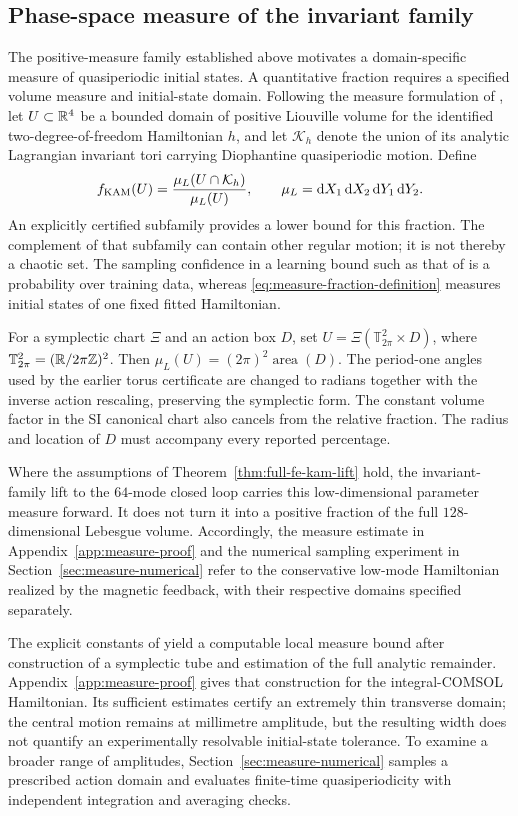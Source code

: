 \subsection{Phase-space measure of the invariant family}
\label{sec:measure-definition}

The positive-measure family established above motivates a domain-specific
measure of quasiperiodic initial states. A quantitative fraction requires
a specified volume measure and initial-state domain. Following the measure formulation of
\citet{biasco2018measure,chierchia2021measure}, let $U\subset\mathbb R^4$ be a
bounded domain of positive Liouville volume for the identified
two-degree-of-freedom Hamiltonian $h$, and
let $\mathcal K_h$ denote the union of its analytic Lagrangian invariant
tori carrying Diophantine quasiperiodic motion. Define
\begin{equation}
 f_{\rm KAM}(U)=\frac{\mu_L(U\cap\mathcal K_h)}{\mu_L(U)},
 \qquad \mu_L=\mathrm dX_1\,\mathrm dX_2\,\mathrm dY_1\,\mathrm dY_2.
 \label{eq:measure-fraction-definition}
\end{equation}
An explicitly certified subfamily provides a lower bound for this
fraction. The complement of that subfamily can contain other regular
motion; it is not thereby a chaotic set. The sampling confidence in a
learning bound such as that of \citet{chen2022} is a probability over
training data, whereas \eqref{eq:measure-fraction-definition} measures
initial states of one fixed fitted Hamiltonian.

For a symplectic chart $\Xi$ and an action box $D$, set
$U=\Xi(\mathbb T^2_{2\pi}\times D)$, where
$\mathbb T^2_{2\pi}=(\mathbb R/2\pi\mathbb Z)^2$. Then
$\mu_L(U)=(2\pi)^2\operatorname{area}(D)$.
The period-one angles used by the earlier torus certificate are changed
to radians together with the inverse action rescaling, preserving the
symplectic form. The constant volume factor in the SI canonical chart
also cancels from the relative fraction. The radius and location of $D$
must accompany every reported percentage.

Where the assumptions of Theorem~\ref{thm:full-fe-kam-lift} hold, the
invariant-family lift to the $64$-mode closed loop carries this
low-dimensional parameter measure forward. It does not turn it into a
positive fraction of the full $128$-dimensional Lebesgue volume.
Accordingly, the measure estimate in Appendix~\ref{app:measure-proof}
and the numerical sampling experiment in Section~\ref{sec:measure-numerical}
refer to the conservative low-mode Hamiltonian realized by the magnetic
feedback, with their respective domains specified separately.


The explicit constants of \citet{chierchia2021measure} yield a computable
local measure bound after construction of a symplectic tube and estimation
of the full analytic remainder. Appendix~\ref{app:measure-proof} gives that
construction for the integral-COMSOL Hamiltonian. Its sufficient estimates
certify an extremely thin transverse domain; the central motion remains
at millimetre amplitude, but the resulting width does not quantify an
experimentally resolvable initial-state tolerance. To examine a broader
range of amplitudes, Section~\ref{sec:measure-numerical} samples a prescribed
action domain and evaluates finite-time quasiperiodicity with independent
integration and averaging checks.
